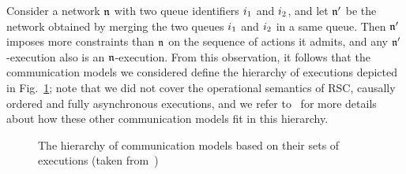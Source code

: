 Consider a network $\mathfrak{n}$ with two queue identifiers $i_1$ and $i_2$,
and let $\mathfrak{n}'$ be the network obtained by merging the two queues $i_1$ and $i_2$ in a 
same queue. Then $\mathfrak{n}'$ imposes more constraints than $\mathfrak{n}$ on the sequence of actions it admits, 
and any $\mathfrak{n}'$-execution also is an $\mathfrak{n}$-execution. From this observation, it follows that
the communication models we considered define the hierarchy of executions depicted in 
Fig.~\ref{fig:hierarchy-of-executions}; note that we did not cover the operational semantics of RSC,
causally ordered and fully asynchronous executions, and we refer to~\cite{DBLP:journals/fac/ChevrouHQ16}
for more details about how these other communication models fit in this hierarchy.

\begin{figure}
    
    \caption{\label{fig:hierarchy-of-executions} The hierarchy of communication models based on their sets of
    executions (taken from~\cite{DBLP:journals/fac/ChevrouHQ16})}
\end{figure}